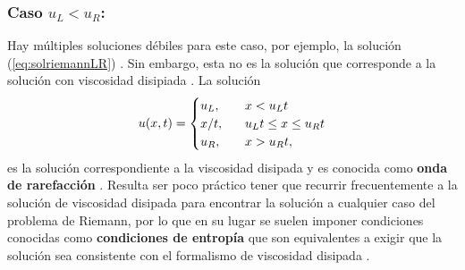 \subsubsection{Caso $u_L < u_R$:}
Hay múltiples soluciones débiles para este caso, por ejemplo, la solución (\ref{eq:solriemannLR}) \cite{Cameron} \cite{Leveque}. Sin embargo, esta no es la solución que corresponde a la solución con viscosidad disipiada \cite{Cameron}. La solución
\begin{equation}
	u(x,t) = 
	\begin{cases}
		u_L, & \hspace{3mm} x < u_{L}t \\
		x/t, & \hspace{3mm} u_{L}t \leq x \leq u_{R}t \\
		u_R, & \hspace{3mm} x > u_{R}t,		
	\end{cases}\label{eq:solriemannRL}
\end{equation}
es la solución correspondiente a la viscosidad disipada y es conocida como \textbf{onda de rarefacción} \cite{Leveque}. Resulta ser poco práctico tener que recurrir frecuentemente a la solución de viscosidad disipada para encontrar la solución a cualquier caso del problema de Riemann, por lo que en su lugar se suelen imponer condiciones conocidas como \textbf{condiciones de entropía} que son equivalentes a exigir que la solución sea consistente con el formalismo de viscosidad disipada \cite{Leveque}.

